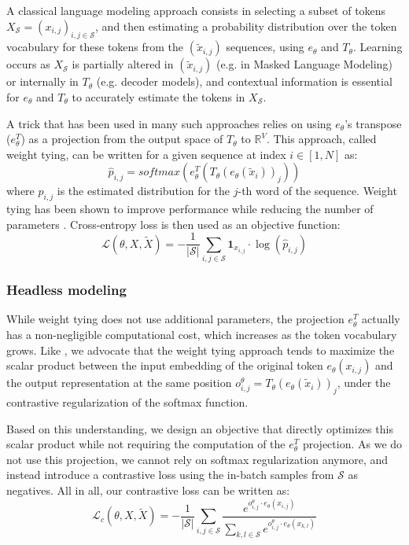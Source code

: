A classical language modeling approach consists in selecting a subset of tokens $X_\mathcal{S} = (x_{i,j})_{i,j \in \mathcal{S}}$, and then estimating a probability distribution over the token vocabulary for these tokens from the $(\tilde{x}_{i,j})$ sequences, using $e_\theta$ and $T_\theta$. Learning occurs as $X_\mathcal{S}$ is partially altered in $(\tilde{x}_{i,j})$ (e.g. in Masked Language Modeling) or internally in $T_\theta$ (e.g. decoder models), and contextual information is essential for $e_\theta$ and $T_\theta$ to accurately estimate the tokens in $X_\mathcal{S}$.

A trick that has been used in many such approaches relies on using $e_\theta$'s transpose ($e_\theta^T$) as a projection from the output space of $T_\theta$ to $\mathbb{R}^V$. This approach, called weight tying, can be written for a given sequence at index $i \in [1, N]$ as:
$$
\hat{p}_{i, j} = softmax \left( e_\theta^T \left(T_\theta(e_\theta(\tilde{x}_{i}))_j\right) \right)
$$
where $\hat{p}_{i, j}$ is the estimated distribution for the $j$-th word of the sequence. Weight tying has been shown to improve performance while reducing the number of parameters \citep{electra}. Cross-entropy loss is then used as an objective function:
$$
\mathcal{L}(\theta, X, \tilde{X}) = - \frac{1}{|\mathcal{S}|}\sum_{i,j \in \mathcal{S}} \mathbf{1}_{x_{i, j}} \cdot \log(\hat{p}_{i, j})
$$

\subsubsection{Headless modeling}

While weight tying does not use additional parameters, the projection $e_\theta^T$ actually has a non-negligible computational cost, which increases as the token vocabulary grows. Like \citet{gao2018representation}, we advocate that the weight tying approach tends to maximize the scalar product between the input embedding of the original token $e_\theta(x_{i, j})$ and the output representation at the same position $o^\theta_{i, j} = T_\theta(e_\theta(\tilde{x}_{i}))_j$, under the contrastive regularization of the softmax function.

Based on this understanding, we design an objective that directly optimizes this scalar product while not requiring the computation of the $e_\theta^T$ projection. As we do not use this projection, we cannot rely on softmax regularization anymore, and instead introduce a contrastive loss using the in-batch samples from $\mathcal{S}$ as negatives. All in all, our contrastive loss can be written as:
$$
\mathcal{L}_c(\theta, X, \tilde{X}) = - \frac{1}{|\mathcal{S}|} \sum_{i,j \in \mathcal{S}} \frac{e^{o^\theta_{i, j} \cdot e_\theta(x_{i, j})}}{\sum_{k,l \in \mathcal{S}} e^{o^\theta_{i, j} \cdot e_\theta(x_{k, l})}}
$$

